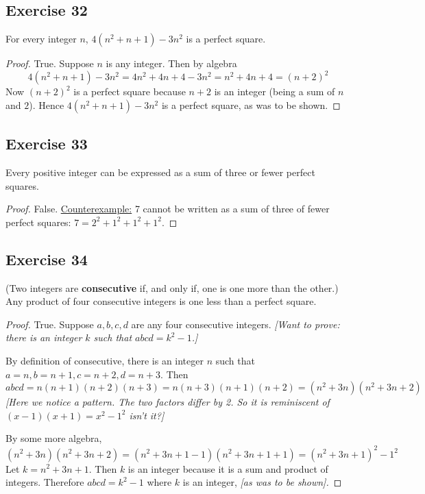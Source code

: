 \documentclass[14pt]{extarticle}
\begin{document}
\subsection{Exercise 32}
For every integer $n$, $4(n^2 + n + 1) - 3n^2$ is a perfect square.

\begin{proof}
True. Suppose $n$ is any integer. Then by algebra
\[
4(n^2 + n + 1) - 3n^2 = 4n^2 + 4n + 4 - 3n^2 = n^2 + 4n + 4 = (n + 2)^2
\]
Now $(n + 2)^2$ is a perfect square because $n + 2$ is an integer (being a sum of $n$ and $2$). Hence $4(n^2 + n + 1) - 3n^2$ is a perfect square, as was to be shown.
\end{proof}

\subsection{Exercise 33}
Every positive integer can be expressed as a sum of three or fewer perfect squares.

\begin{proof}
False. \underline{Counterexample:} 7 cannot be written as a sum of three of fewer perfect squares: $7 = 2^2 + 1^2 + 1^2 + 1^2$.
\end{proof}

\subsection{Exercise 34}
(Two integers are {\bf consecutive} if, and only if, one is one more than the other.) Any product of four consecutive integers is one less than a perfect square.

\begin{proof}
True. Suppose $a, b, c, d$ are any four consecutive integers. {\it [Want to prove: there is an integer $k$ such that $abcd = k^2 - 1$.]}

By definition of consecutive, there is an integer $n$ such that $a = n, b = n+1, c = n+2, d = n+3$. Then
\[
abcd = n(n+1)(n+2)(n+3) = n(n+3)(n+1)(n+2) = (n^2+3n)(n^2+3n+2)
\]
{\it [Here we notice a pattern. The two factors differ by 2. So it is reminiscent of $(x-1)(x+1) = x^2 - 1^2$ isn't it?]}

By some more algebra,
\[
(n^2+3n)(n^2+3n+2) = (n^2+3n+1-1)(n^2+3n+1+1) = (n^2+3n+1)^2-1^2
\]
Let $k = n^2+3n+1$. Then $k$ is an integer because it is a sum and product of integers. Therefore $abcd = k^2 - 1$ where $k$ is an integer, {\it [as was to be shown].}
\end{proof}
\end{document}
